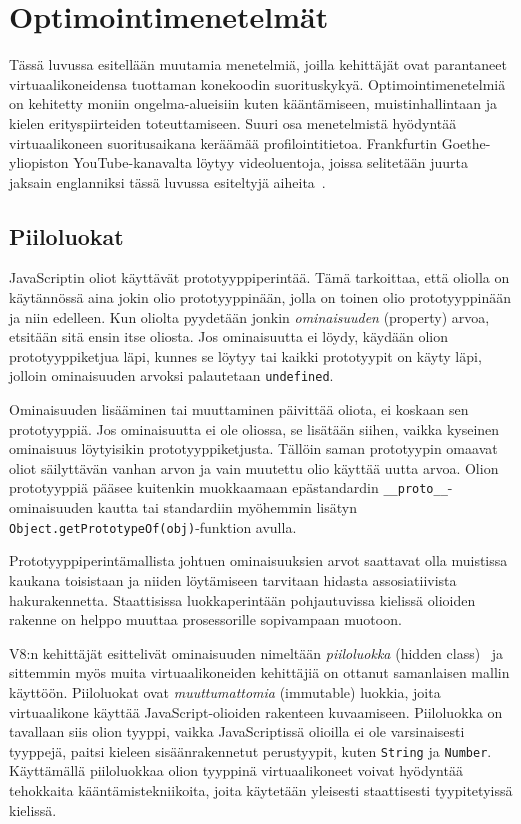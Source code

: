 \pagebreak
\section{Optimointimenetelmät}

Tässä luvussa esitellään muutamia menetelmiä, joilla kehittäjät ovat parantaneet virtuaalikoneidensa tuottaman konekoodin suorituskykyä. Optimointimenetelmiä on kehitetty moniin ongelma-alueisiin kuten kääntämiseen, muistinhallintaan ja kielen erityspiirteiden toteuttamiseen. Suuri osa menetelmistä hyödyntää virtuaalikoneen suoritusaikana keräämää profilointitietoa. Frankfurtin Goethe-yliopiston YouTube-kanavalta löytyy videoluentoja, joissa selitetään juurta jaksain englanniksi tässä luvussa esiteltyjä aiheita~\cite{goetheuni}.

\subsection{Piiloluokat}

JavaScriptin oliot käyttävät prototyyppiperintää. Tämä tarkoittaa, että oliolla on käytännössä aina jokin olio prototyyppinään, jolla on toinen olio prototyyppinään ja niin edelleen. Kun oliolta pyydetään jonkin \textit{ominaisuuden} (property) arvoa, etsitään sitä ensin itse oliosta. Jos ominaisuutta ei löydy, käydään olion prototyyppiketjua läpi, kunnes se löytyy tai kaikki prototyypit on käyty läpi, jolloin ominaisuuden arvoksi palautetaan \texttt{undefined}.

Ominaisuuden lisääminen tai muuttaminen päivittää oliota, ei koskaan sen prototyyppiä. Jos ominaisuutta ei ole oliossa, se lisätään siihen, vaikka kyseinen ominaisuus löytyisikin prototyyppiketjusta. Tällöin saman prototyypin omaavat oliot säilyttävän vanhan arvon ja vain muutettu olio käyttää uutta arvoa. Olion prototyyppiä pääsee kuitenkin muokkaamaan epästandardin \texttt{\_\_proto\_\_}-ominaisuuden kautta tai standardiin myöhemmin lisätyn \texttt{Object.getPrototypeOf(obj)}-funktion avulla.

Prototyyppiperintämallista johtuen ominaisuuksien arvot saattavat olla muistissa kaukana toisistaan ja niiden löytämiseen tarvitaan hidasta assosiatiivista hakurakennetta. Staattisissa luokkaperintään pohjautuvissa kielissä olioiden rakenne on helppo muuttaa prosessorille sopivampaan muotoon.

V8:n kehittäjät esittelivät ominaisuuden nimeltään \textit{piiloluokka} (hidden class)~\cite{v8design} ja sittemmin myös muita virtuaalikoneiden kehittäjiä on ottanut samanlaisen mallin käyttöön. Piiloluokat ovat \textit{muuttumattomia} (immutable) luokkia, joita virtuaalikone käyttää JavaScript-olioiden rakenteen kuvaamiseen. Piiloluokka on tavallaan siis olion tyyppi, vaikka JavaScriptissä olioilla ei ole varsinaisesti tyyppejä, paitsi kieleen sisäänrakennetut perustyypit, kuten \texttt{String} ja \texttt{Number}. Käyttämällä piiloluokkaa olion tyyppinä virtuaalikoneet voivat hyödyntää tehokkaita kääntämistekniikoita, joita käytetään yleisesti staattisesti tyypitetyissä kielissä.

